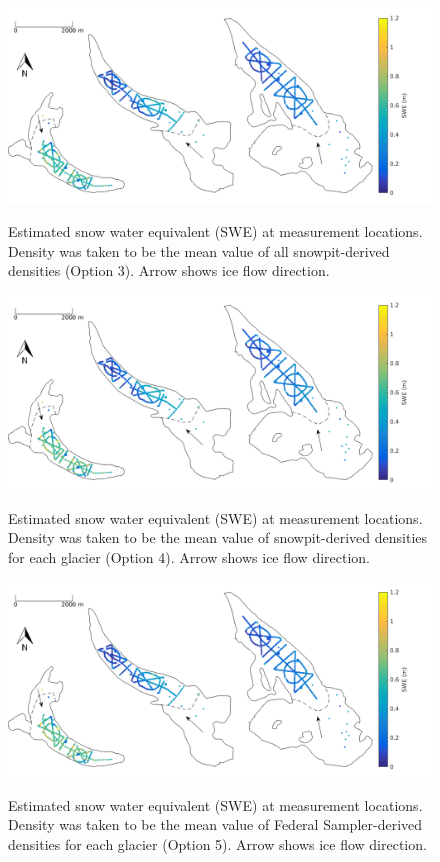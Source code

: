 \documentclass[12pt]{article}
\begin{document}
\begin{figure}[H]
	\centering
	\includegraphics[width = \textwidth]{SWEmap_opt3.png}\\
	\caption{Estimated snow water equivalent (SWE) at measurement locations. Density was taken to be the mean value of all snowpit-derived densities (Option 3). Arrow shows ice flow direction.}
\end{figure}

\begin{figure}[H]
	\centering
	\includegraphics[width =\textwidth]{SWEmap_opt4.png}\\
	\caption{Estimated snow water equivalent (SWE) at measurement locations. Density was taken to be the mean value of snowpit-derived densities for each glacier (Option 4). Arrow shows ice flow direction.}
\end{figure}

\begin{figure}[H]
	\centering
	\includegraphics[width = \textwidth]{SWEmap_opt5.png}\\
	\caption{Estimated snow water equivalent (SWE) at measurement locations. Density was taken to be the mean value of Federal Sampler-derived densities for each glacier (Option 5). Arrow shows ice flow direction.}
\end{figure}
\end{document}
